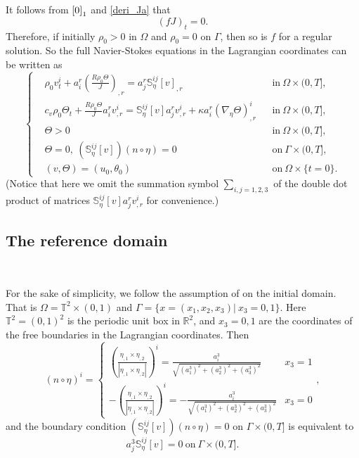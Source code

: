 \documentclass[12pt,a4paper]{amsart}
\numberwithin{equation}{section}
\theoremstyle{plain}
\theoremstyle{definition}
\begin{document}
It follows from $\eqref{0}_1$ and \eqref{deri_Ja} that
\begin{equation*}
(fJ)_t=0.
\end{equation*}
Therefore, if initially $\rho_0>0$ in $\Omega$ and $\rho_0=0$ on $\Gamma$, then so is $f$ for a regular solution.
So the full Navier-Stokes equations in the Lagrangian coordinates can be written as
\begin{equation}\label{1}
\left\{
\begin{aligned}
& \rho_0 v^i_t+a^r_i (\frac{R\rho_0 \Theta}{J})_{,r} = a^r_j \mathbb{S}^{ij}_{\eta}[v]_{,r} &&\text{in}\ \Omega\times(0,T],\\
& c_v \rho_0\Theta_t +\frac{R\rho_0\Theta}{J}a^r_iv^i_{,r}=  \mathbb{S}^{ij}_{\eta}[v]a^r_jv^i_{,r}+\kappa a^r_i(\nabla_{\eta}\Theta)^i_{,r} &&\text{in}\ \Omega\times(0,T],\\
& \Theta>0 &&\text{in}\ \Omega\times(0,T],\\
& \Theta=0,\  (\mathbb{S}_{\eta}^{ij}[v]) (n\circ \eta) =0 &&\text{on}\ \Gamma\times(0,T],\\
& (v,\Theta)=(u_0,\theta_0) && \text{on}\ \Omega\times\{t=0 \}.
\end{aligned}
\right.
\end{equation}
(Notice that here we omit the summation symbol $\sum\limits_{i,j=1,2,3}$ of the double dot product of matrices $\mathbb{S}^{ij}_{\eta}[v]a^r_jv^i_{,r}$ for convenience.)
\vspace{0.3cm}

\subsection{The reference domain}~

For the sake of simplicity, we follow the assumption of \cite{Coutand2012, Jang2015} on the initial domain.
That is $\Omega=\mathbb{T}^2\times(0,1)$ and $\Gamma=\{x=(x_1,x_2,x_3)|~x_3=0,1\}$.
Here $\mathbb{T}^2=(0,1)^2$ is the periodic unit box in $\mathbb{R}^2$, and $x_3=0,1$ are the coordinates of the free boundaries in the Lagrangian coordinates.
Then 
\begin{equation*}
(n\circ \eta)^i=\begin{cases}
\left(\frac{\eta_{,1}\times \eta_{,2}}{|\eta_{,1}\times \eta_{,2}|}\right)^i=\frac{a^3_i}{\sqrt{(a^3_1)^2+(a^3_2)^2+(a^3_3)^2}} & x_3=1\\
-\left(\frac{\eta_{,1}\times \eta_{,2}}{|\eta_{,1}\times \eta_{,2}|}\right)^i=-\frac{a^3_i}{\sqrt{(a^3_1)^2+(a^3_2)^2+(a^3_3)^2}} & x_3=0
\end{cases},
\end{equation*}
and the boundary condition $(\mathbb{S}_{\eta}^{ij}[v]) (n\circ \eta) =0$ on $\Gamma\times(0,T]$ is equivalent to 
$$
a^3_j \mathbb{S}_{\eta}^{ij}[v]=0 ~\text{on}~\Gamma\times(0,T].
$$
\end{document}
